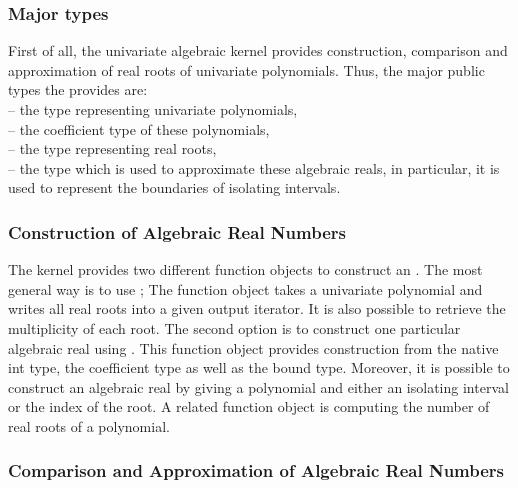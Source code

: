 \subsubsection{Major types}
First of all, the univariate algebraic kernel provides construction, comparison and 
approximation of real roots of univariate polynomials. 
Thus, the major public types the  provides are: \\
 -- the type representing univariate polynomials,\\
 -- the coefficient type of these polynomials, \\
 -- the type representing real roots,\\
 -- the type which is used to approximate these algebraic reals, 
in particular, it is used to represent the boundaries of isolating intervals. \\

\subsubsection{Construction of Algebraic Real Numbers }

The kernel provides two different function objects to construct an
. The most general way
is to use ; The function object
takes a univariate polynomial and writes all real roots into a given
output iterator. It is also possible to retrieve the multiplicity of
each root. The second option is to construct one particular algebraic
real using .
This function object provides construction from the native int type, the
coefficient type as well as the bound type.  Moreover, it is possible
to construct an algebraic real by giving a polynomial and either an
isolating interval or the index of the root. A related function object
is  computing the number
of real roots of a polynomial.



\subsubsection{ Comparison and Approximation of Algebraic Real Numbers}

